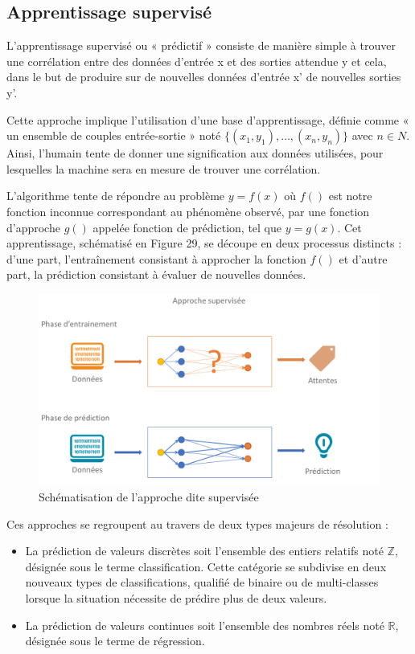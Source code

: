 \subsection{Apprentissage supervisé}
L’apprentissage supervisé ou « prédictif » consiste de manière simple à trouver une corrélation entre des données d’entrée x et des sorties attendue y et cela, dans le but de produire sur de nouvelles données d’entrée x' de nouvelles sorties y'.\par
Cette approche implique l’utilisation d’une base d’apprentissage, définie comme « un ensemble de couples entrée-sortie » noté $\{(x_1,y_1 ),…,(x_n,y_n )\}$ avec $n \in N$. Ainsi, l’humain tente de donner une signification aux données utilisées, pour lesquelles la machine sera en mesure de trouver une corrélation.\par
L’algorithme tente de répondre au problème $y=f(x)$ où $f()$ est notre fonction inconnue correspondant au phénomène observé, par une fonction d’approche $g()$ appelée fonction de prédiction, tel que $y=g(x)$.
Cet apprentissage, schématisé en Figure 29, se découpe en deux processus distincts : d’une part, l’entraînement consistant à approcher la fonction $f()$ et d’autre part, la prédiction consistant à évaluer de nouvelles données.\par
  
\begin{figure}[H]
    \centering
    \includegraphics[width=\linewidth]{contents/chapter_3/resources/supervised_classification.pdf}
    \caption{Schématisation de l’approche dite supervisée}
    \label{fig:supervised_classification}
\end{figure}

Ces approches se regroupent au travers de deux types majeurs de résolution :
\begin{itemize}
    \item La prédiction de valeurs discrètes soit l’ensemble des entiers relatifs noté $\pmb{\mathbb{Z}}$, désignée sous le terme classification. Cette catégorie se subdivise en deux nouveaux types de classifications, qualifié de binaire ou de multi-classes lorsque la situation nécessite de prédire plus de deux valeurs.
    \item La prédiction de valeurs continues soit l’ensemble des nombres réels noté $\pmb{\mathbb{R}}$, désignée sous le terme de régression.
\end{itemize}\par
	

